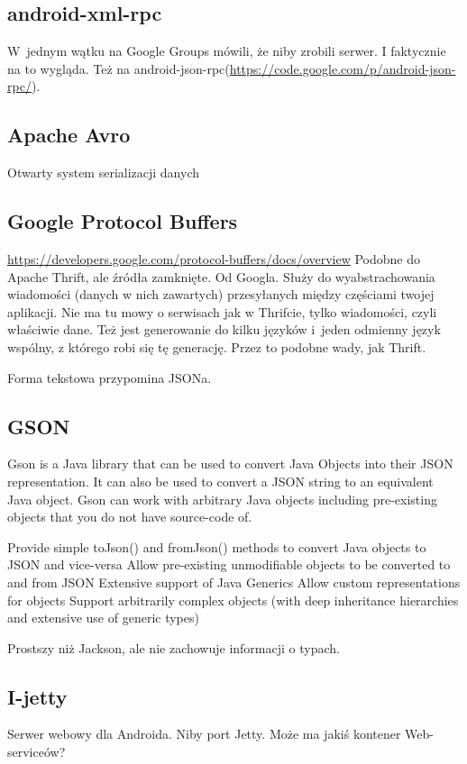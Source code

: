 \subsection{android-xml-rpc}
W~jednym wątku na Google Groups \cite{android-rpc-thread} mówili, że niby zrobili serwer. I faktycznie na to wygląda.
Też na android-json-rpc(\url{https://code.google.com/p/android-json-rpc/}).


\subsection{Apache Avro}
Otwarty system serializacji danych


\subsection{Google Protocol Buffers}
\url{https://developers.google.com/protocol-buffers/docs/overview}
Podobne do Apache Thrift, ale źródła zamknięte. Od Googla. Służy do wyabstrachowania wiadomości (danych w nich zawartych) przesyłanych między częściami twojej aplikacji.
Nie ma tu mowy o serwisach jak w Thrifcie, tylko wiadomości, czyli właściwie dane.
Też jest generowanie do kilku języków i~jeden odmienny język wspólny, z którego robi się tę generację. Przez to podobne wady, jak Thrift.

Forma tekstowa przypomina JSONa.


\subsection{GSON}
Gson is a Java library that can be used to convert Java Objects into their JSON representation. It can also be used to convert a JSON string to an equivalent Java object. Gson can work with arbitrary Java objects including pre-existing objects that you do not have source-code of.

Provide simple toJson() and fromJson() methods to convert Java objects to JSON and vice-versa
Allow pre-existing unmodifiable objects to be converted to and from JSON
Extensive support of Java Generics
Allow custom representations for objects
Support arbitrarily complex objects (with deep inheritance hierarchies and extensive use of generic types)

Prostszy niż Jackson, ale nie zachowuje informacji o typach. 


\subsection{I-jetty}
Serwer webowy dla Androida. Niby port Jetty. Może ma jakiś kontener Web-serviceów?


